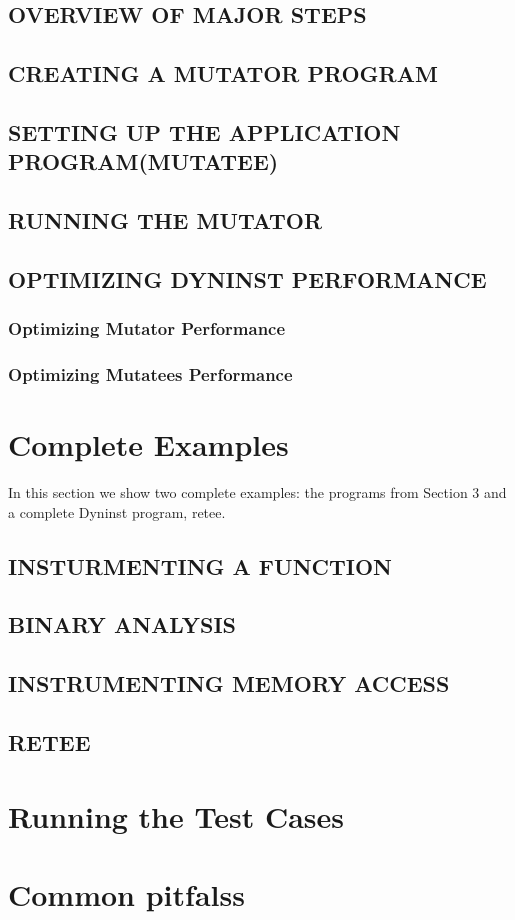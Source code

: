 \documentclass[twopages,a4paper]{article}
\begin{document}
\subsection{OVERVIEW OF MAJOR STEPS}
\subsection{CREATING A MUTATOR PROGRAM}
\subsection{SETTING UP THE APPLICATION PROGRAM(MUTATEE)}
\subsection{RUNNING THE MUTATOR}
\subsection{OPTIMIZING DYNINST PERFORMANCE}
\subsubsection{Optimizing Mutator Performance}
\subsubsection{Optimizing Mutatees Performance}

\appendix
\section{Complete Examples}\label{appdx:complete_examples}
In this section we show two complete examples: the programs from Section 3 and a complete Dyninst program, retee.\\

\subsection{INSTURMENTING A FUNCTION}



\subsection{BINARY ANALYSIS}
\subsection{INSTRUMENTING MEMORY ACCESS}
\subsection{RETEE}
\section{Running the Test Cases}
\section{Common pitfalss}

\printindex[terms]

\pagebreak



\end{document}
